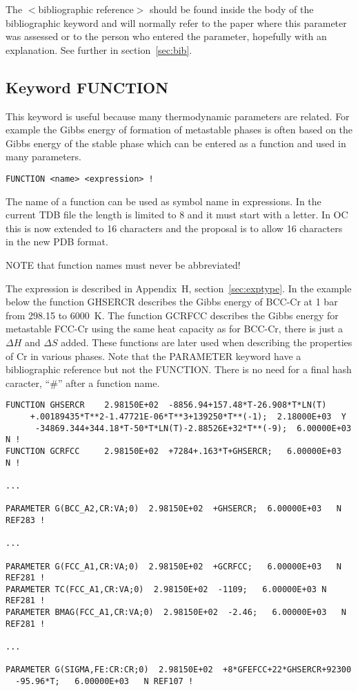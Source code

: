 \documentclass[12pt]{article}
\begin{document}
The $<$bibliographic reference$>$ should be found inside the body of
the bibliographic keyword and will normally refer to the paper where
this parameter was assessed or to the person who entered the
parameter, hopefully with an explanation.  See further in
section~\ref{sec:bib}.


\subsection{Keyword FUNCTION}

This keyword is
useful because many thermodynamic parameters are related.  For example
the Gibbs energy of formation of metastable phases is often based on
the Gibbs energy of the stable phase which can be entered
as a function and used in many parameters.

\begin{verbatim}
FUNCTION <name> <expression> !
\end{verbatim}

The name of a function can be used as symbol name in expressions.  In
the current TDB file the length is limited to 8 and it must start with
a letter.  In OC this is now extended to 16 characters and the
proposal is to allow 16 characters in the new PDB format.

NOTE that function names must never be abbreviated!

The expression is described in Appendix~H, section~\ref{sec:exptype}.
In the example below the function GHSERCR describes the Gibbs energy
of BCC-Cr at 1 bar from 298.15 to 6000~K.  The function GCRFCC
describes the Gibbs energy for metastable FCC-Cr using the same heat
capacity as for BCC-Cr, there is just a $\Delta H$ and $\Delta S$
added.  These functions are later used when describing the properties
of Cr in various phases.  Note that the PARAMETER keyword have a
bibliographic reference but not the FUNCTION.  There is no need for a
final hash caracter, ``\#'' after a function name.

\begin{verbatim}
FUNCTION GHSERCR    2.98150E+02  -8856.94+157.48*T-26.908*T*LN(T)
     +.00189435*T**2-1.47721E-06*T**3+139250*T**(-1);  2.18000E+03  Y
      -34869.344+344.18*T-50*T*LN(T)-2.88526E+32*T**(-9);  6.00000E+03  N !
FUNCTION GCRFCC     2.98150E+02  +7284+.163*T+GHSERCR;   6.00000E+03   N !

...

PARAMETER G(BCC_A2,CR:VA;0)  2.98150E+02  +GHSERCR;  6.00000E+03   N REF283 !

...

PARAMETER G(FCC_A1,CR:VA;0)  2.98150E+02  +GCRFCC;   6.00000E+03   N REF281 !
PARAMETER TC(FCC_A1,CR:VA;0)  2.98150E+02  -1109;   6.00000E+03 N   REF281 !
PARAMETER BMAG(FCC_A1,CR:VA;0)  2.98150E+02  -2.46;   6.00000E+03   N REF281 !

...

PARAMETER G(SIGMA,FE:CR:CR;0)  2.98150E+02  +8*GFEFCC+22*GHSERCR+92300
  -95.96*T;   6.00000E+03   N REF107 !

\end{verbatim}
\end{document}
